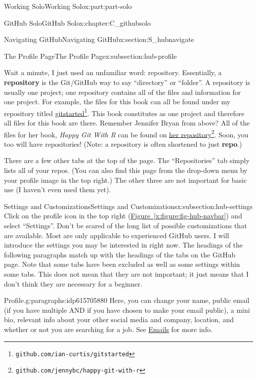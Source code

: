 \documentclass[oneside,10pt,]{book}
\newcommand{\xreffont}{\relax}
\newcommand{\terminology}[1]{\textbf{#1}}
\newcommand{\pubtitle}[1]{\textsl{#1}}
\begin{document}
\begin{partptx}{Working Solo}{}{Working Solo}{}{}{x:part:part-solo}
\begin{chapterptx}{GitHub Solo}{}{GitHub Solo}{}{}{x:chapter:C_githubsolo}
\begin{sectionptx}{Navigating GitHub}{}{Navigating GitHub}{}{}{x:section:S_hubnavigate}
\begin{subsectionptx}{The Profile Page}{}{The Profile Page}{}{}{x:subsection:hub-profile}
\par
Wait a minute, I just used an unfamiliar word: repository. Essentially, a \terminology{repository} is the Git\slash{}GitHub way to say ``directory'' or ``folder''. A repository is usually one project; one repository contains all of the files and information for one project. For example, the files for this book can all be found under my repository titled \href{https://github.com/ian-curtis/gitstarted}{gitstarted}\footnote{\nolinkurl{github.com/ian-curtis/gitstarted}\label{g:fn:idp615698456}}. This book constitutes as one project and therefore all files for this book are there. Remember Jennifer Bryan from above? All of the files for her book, \pubtitle{Happy Git With R} can be found on \href{https://github.com/jennybc/happy-git-with-r}{her repository}\footnote{\nolinkurl{github.com/jennybc/happy-git-with-r}\label{g:fn:idp615696664}}. Soon, you too will have repositories! (Note: a repository is often shortened to just \terminology{repo}.)%
\par
There are a few other tabs at the top of the page. The ``Repositories'' tab simply lists all of your repos. (You can also find this page from the drop-down menu by your profile image in the top right.) The other three are not important for basic use (I haven't even used them yet).%
\end{subsectionptx}
%
%
\typeout{************************************************}
\typeout{************************************************}
%
\begin{subsectionptx}{Settings and Customizations}{}{Settings and Customizations}{}{}{x:subsection:hub-settings}
%
%
Click on the profile icon in the top right (\hyperref[x:figure:fig-hub-navbar]{Figure~{\xreffont\ref{x:figure:fig-hub-navbar}}}) and select ``Settings''. Don't be scared of the long list of possible customizations that are available. Most are only applicable to experienced GitHub users. I will introduce the settings you may be interested in right now. The headings of the following paragraphs match up with the headings of the tabs on the GitHub page. Note that some tabs have been excluded as well as some settings within some tabs. This does not mean that they are not important; it just means that I don't think they are necessary for a beginner.%
\begin{paragraphs}{Profile.}{g:paragraphs:idp615705880}%
%
Here, you can change your name, public email (if you have multiple AND if you have chosen to make your email public), a mini bio, relevant info about your other social media and company, location, and whether or not you are searching for a job. See \hyperlink{x:paragraphs:hub-emails}{Emails} for more info.%

\end{paragraphs}
\end{subsectionptx}
\end{sectionptx}
\end{chapterptx}
\end{partptx}
\end{document}
